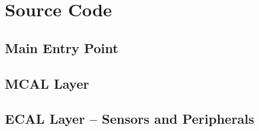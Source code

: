 \appendix
\section{Source Code}

\subsection{Main Entry Point}


\subsection{MCAL Layer}




\subsection{ECAL Layer -- Sensors and Peripherals}
















